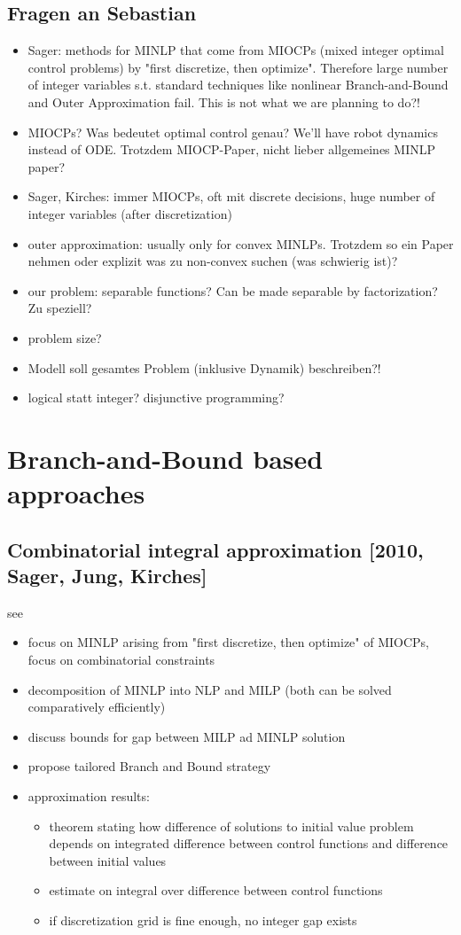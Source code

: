 \documentclass{article}
\begin{document}
\subsection{Fragen an Sebastian}
\begin{itemize}
\item Sager: methods for MINLP that come from MIOCPs (mixed integer optimal control problems) by "first discretize, then optimize". Therefore large number of integer variables s.t. standard techniques like nonlinear Branch-and-Bound and Outer Approximation fail. This is not what we are planning to do?!
\item MIOCPs? Was bedeutet optimal control genau? We'll have robot dynamics instead of ODE. Trotzdem MIOCP-Paper, nicht lieber allgemeines MINLP paper?
\item Sager, Kirches: immer MIOCPs, oft mit discrete decisions, huge number of integer variables (after discretization)
\item outer approximation: usually only for convex MINLPs. Trotzdem so ein Paper nehmen oder explizit was zu non-convex suchen (was schwierig ist)?
\item our problem: separable functions? Can be made separable by factorization? Zu speziell?
\item problem size?
\item Modell soll gesamtes Problem (inklusive Dynamik) beschreiben?!
\item logical statt integer? disjunctive programming?
\end{itemize}
\newpage
\section{Branch-and-Bound based approaches}
\subsection{Combinatorial integral approximation [2010, Sager, Jung, Kirches]}
see \cite{sager2011combinatorial}
\begin{itemize}
\item focus on MINLP arising from "first discretize, then optimize" of MIOCPs, focus on combinatorial constraints
\item decomposition of MINLP into NLP and MILP (both can be solved comparatively efficiently)
\item discuss bounds for gap between MILP ad MINLP solution
\item propose tailored Branch and Bound strategy
\item approximation results:
	\begin{itemize}
	\item theorem stating how difference of solutions to initial value problem depends on integrated difference between control functions and difference between initial values
	\item estimate on integral over difference between control functions
	\item if discretization grid is fine enough, no integer gap exists
	\end{itemize}
\end{itemize}
\end{document}
